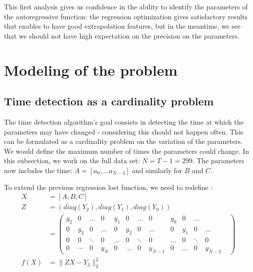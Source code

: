 \documentclass[11pt]{article}
\begin{document}
    This first analysis gives us confidence in the ability to identify the parameters of the autoregressive function: the regression optimization gives satisfactory results that enables to have good extrapolation features, but in the meantime, we see that we should not have high expectation on the precision on the parameters.

\section{Modeling of the problem}
    \subsection{Time detection as a cardinality problem}
        The time detection algorithm's goal consists in detecting the time at which the parameters may have changed - considering this should not happen often. This can be formulated as a cardinality problem on the variation of the parameters. We would define the maximum number of times the parameters could change.
        In this subsection, we work on the full data set: $N = T-1 = 299$. The parameters now includes the time: $A=[a_0, \ldots a_{N-3}]$ and similarly for $B$ and $C$.
        
        To extend the previous regression lost function, we need to redefine :
        \begin{equation*}
            \begin{aligned}
                X &= [A, B, C] \\
                Z &= (diag(Y_2), diag(Y_1), diag(Y_0))\\
                &= \begin{pmatrix} 
                    y_2 & 0 & \ldots & 0 & y_1 & 0 & \ldots & 0 & y_0 & 0 & \ldots \\
                    0 & y_3 & 0 & \ldots & 0 & y_2 & 0 & \ldots & 0 & y_1 & 0 & \ldots \\
                    0 & 0 & \ddots & 0 & \ldots & 0 & \ddots & 0 & \ldots & 0 & \ddots & 0 & \\
                    0 & \cdots & 0 & y_{N} & 0 & \ldots & 0 & y_{N-1} & 0 & \ldots & 0 & y_{N-2}
                \end{pmatrix} \\
                f (X) &= \lVert ZX - Y_3 \rVert^2_2
            \end{aligned}
        \end{equation*}
\end{document}
